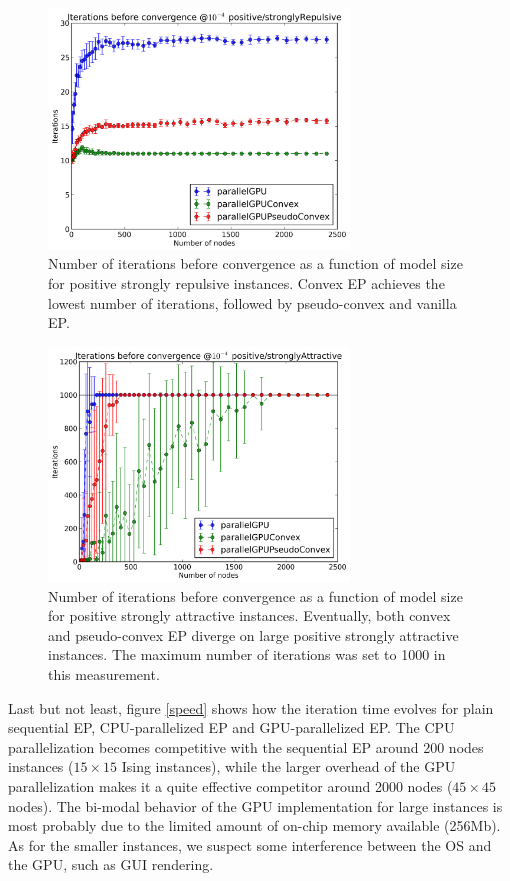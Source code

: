 \documentclass[times, 10pt,twocolumn]{article}
\begin{document}
\begin{figure}[h!]\centering
	\includegraphics[width=8cm]{plots/sizes/Iterations_before_convergence_e-4_positive_stronglyRepulsive.png}
	\caption{Number of iterations before convergence as a function of model size for positive strongly repulsive instances. Convex EP achieves the lowest number of iterations, followed by pseudo-convex and vanilla EP.}
	\label{asympt-psr}
\end{figure}

\begin{figure}[h!]\centering
	\includegraphics[width=8cm]{plots/sizes/Iterations_before_convergence_e-4_positive_stronglyAttractive.png}
	\caption{Number of iterations before convergence as a function of model size for positive strongly attractive instances. Eventually, both convex and pseudo-convex EP diverge on large positive strongly attractive instances. The maximum number of iterations was set to 1000 in this measurement.}
	\label{asympt-psa}
\end{figure}

Last but not least, figure \ref{speed} shows how the iteration time evolves for plain sequential EP, CPU-parallelized EP and GPU-parallelized EP. The CPU parallelization becomes competitive with the sequential EP around 200 nodes instances ($15 \times 15$ Ising instances), while the larger overhead of the GPU parallelization makes it a quite effective competitor around 2000 nodes ($45 \times 45$ nodes). The bi-modal behavior of the GPU implementation for large instances is most probably due to the limited amount of on-chip memory available (256Mb). As for the smaller instances, we suspect some interference between the OS and the GPU, such as GUI rendering.
\end{document}
